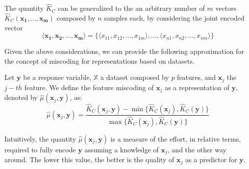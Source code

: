 The quantity $\hat{K}_C$ can be generalized to the an arbitrary number of $m$ vectors $\hat{K}_C(\mathbf{x_1}, \ldots, \mathbf{x_m})$ composed by $n$ samples each, by considering the joint encoded vector
\[
\langle \mathbf{x_1}, \mathbf{x_2}, \ldots, \mathbf{x_m} \rangle = \{ \langle x_{11}, x_{12}, \ldots, x_{1m} \rangle, \ldots, \langle x_{n1}, x_{n2}, \ldots, x_{nm} \rangle \}
\]

Given the above considerations, we can provide the following approximation for the concept of miscoding for representations based on datasets.

\begin{definition}
Let $\mathbf{y}$ be a response variable, $\mathbb{X}$ a dataset composed by $p$ features, and $\mathbf{x}_j$ the $j-th$ feature. We define the feature miscoding of $\mathbf{x}_j$ as a representation of $\mathbf{y}$, denoted by $\hat\mu(\mathbf{x}_j, \mathbf{y})$, as:
\[
\hat\mu(\mathbf{x}_j, \mathbf{y}) = \frac{ \hat{K}_C(\mathbf{x}_j, \mathbf{y}) - \min\{ \hat{K}_C(\mathbf{x}_j), \hat{K}_C(\mathbf{y}) \} } { \max\{ \hat{K}_C(\mathbf{x}_j), \hat{K}_C(\mathbf{y}) \} }
\]\end{definition}

Intuitively, the quantity $\hat\mu(\mathbf{x}_j, \mathbf{y})$ is a measure of the effort, in relative terms, required to fully encode $\mathbf{y}$ assuming a knowledge of $\mathbf{x}_j$, and the other way around. The lower this value, the better is the quality of $\mathbf{x}_j$ as a predictor for $\mathbf{y}$.


